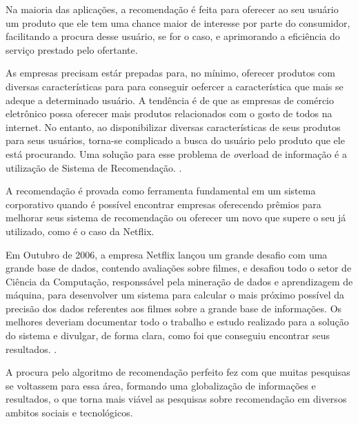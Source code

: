 \documentclass[12pt,
				openright,
				twoside,
				a4paper,
				apter=TITLE,
				section=TITLE,
				subsection=TITLE,
				chapter=TITLE,
				english,
				french,
				spanish,
				brazil]{abntex2}
\begin{document}
Na maioria das aplicações, a recomendação é feita para oferecer ao seu usuário um produto que ele tem uma chance maior de interesse por parte do consumidor, facilitando a procura desse usuário, se for o caso, e aprimorando a eficiência do serviço prestado pelo ofertante.

\begin{citacao}
As empresas precisam estár prepadas para, no mínimo, oferecer produtos com diversas características para para conseguir oefercer a característica que mais se adeque a determinado usuário. A tendência é de que as empresas de comércio eletrônico possa oferecer mais produtos relacionados com o gosto de todos na internet. No entanto, ao disponibilizar diversas características de seus produtos para seus usuários, torna-se complicado a busca do usuário pelo produto que ele está procurando. Uma solução para esse problema de \textit overload de informação é a utilização de Sistema de Recomendação.  
\cite[4.0]{schafer1999recommender}.
\end{citacao}

A recomendação é provada como ferramenta fundamental em um sistema corporativo quando é possível encontrar empresas oferecendo prêmios para melhorar seus sistema de recomendação ou oferecer um novo que supere o seu já utilizado, como é o caso da Netflix.

\begin{citacao}
Em Outubro de 2006, a empresa Netflix lançou um grande desafio com uma grande base de dados, contendo avaliações sobre filmes, e desafiou todo o setor de Ciência da Computação, responssável pela mineração de dados e aprendizagem de máquina, para desenvolver um sistema para calcular o mais próximo possível da precisão dos dados referentes aos filmes sobre a grande base de informações. Os melhores deveriam documentar todo o trabalho e estudo realizado para a solução do sistema e divulgar, de forma clara, como foi que conseguiu encontrar seus resultados. 
\cite[4.0]{bennett2007netflix}.
\end{citacao}

A procura pelo algoritmo de recomendação perfeito fez com que muitas pesquisas se voltassem para essa área, formando uma globalização de informações e resultados, o que torna mais viável as pesquisas sobre recomendação em diversos ambitos sociais e tecnológicos. 

\end{document}
